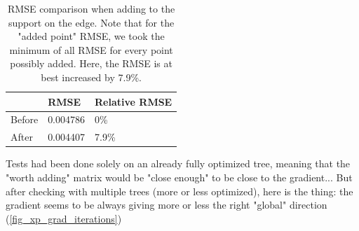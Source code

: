 \begin{table}[!h]\centering
\begin{tabular}{@{}lll@{}}\toprule
 & RMSE & Relative RMSE \\ \midrule
Before & 0.004786 & 0\% \\
After & 0.004407 & 7.9\% \\ \bottomrule
\end{tabular}
\caption{RMSE comparison when adding to the support on the  edge. Note that for the "added point" RMSE, we took the minimum of all RMSE for every point possibly added. Here, the RMSE is at best increased by 7.9\%.}
\end{table}


Tests had been done solely on an already fully optimized tree, meaning that the "worth adding" matrix would be "close enough" to be close to the gradient...
But after checking with multiple trees (more or less optimized), here is the thing: the gradient seems to be always giving more or less the right "global" direction (\cref{fig_xp_grad_iterations})

